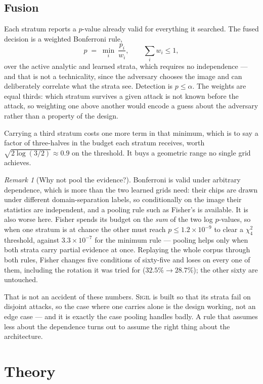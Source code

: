 \documentclass[10pt,twocolumn]{article}
\theoremstyle{definition}
\theoremstyle{remark}
\newtheorem{remark}[theorem]{Remark}
\newcommand{\sigil}{\textsc{Sigil}}
\begin{document}
\subsection{Fusion}
\label{sec:fusion}

Each stratum reports a $p$-value already valid for everything it searched. The
fused decision is a weighted Bonferroni rule,
\[
  p \;=\; \min_{i}\ \frac{p_i}{w_i},
  \qquad \sum_i w_i\leq 1,
\]
 over the active analytic and learned strata, which requires no
independence --- and that is not a technicality, since the adversary chooses the
image and can deliberately correlate what the strata see. Detection is
$p\leq\alpha$. The weights are equal thirds: which stratum survives a given
attack is not known before the attack, so weighting one above another would
encode a guess about the adversary rather than a property of the design.

Carrying a third stratum costs one more term in that minimum, which is to say a
factor of three-halves in the budget each stratum receives, worth
$\sqrt{2\log(3/2)}\approx0.9$ on the threshold. It buys a geometric range no
single grid achieves.

\begin{remark}[Why not pool the evidence?]
Bonferroni is valid under arbitrary dependence, which is more than the two
learned grids need: their chips are drawn under different domain-separation
labels, so conditionally on the image their statistics are independent, and a
pooling rule such as Fisher's is available. It is also worse here. Fisher spends
its budget on the \emph{sum} of the two log $p$-values, so when one stratum is at
chance the other must reach $p\leq1.2\times10^{-9}$ to clear a $\chi^{2}_{4}$
threshold, against $3.3\times10^{-7}$ for the minimum rule --- pooling helps only
when both strata carry partial evidence at once. Replaying the whole corpus
through both rules, Fisher changes five conditions of sixty-five and loses on
every one of them, including the rotation it was tried for
($32.5\%\rightarrow28.7\%$); the other sixty are untouched.

That is not an accident of these numbers. \sigil{} is built so that its strata
fail on disjoint attacks, so the case where one carries alone is the design
working, not an edge case --- and it is exactly the case pooling handles badly.
A rule that assumes less about the dependence turns out to assume the right
thing about the architecture.
\end{remark}

\section{Theory}
\label{sec:theory}
\end{document}
